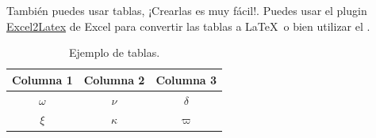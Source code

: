 	También puedes usar tablas, ¡Crearlas es muy fácil!. Puedes usar el plugin \href{https://www.ctan.org/tex-archive/support/excel2latex}{Excel2Latex} \cite{excel2latex} de Excel para convertir las tablas a \LaTeX\ o bien utilizar el  \cite{tablesgenerator}.

	\begin{table}[H]
		\centering
		\caption{Ejemplo de tablas.}
		\begin{tabular}{ccc}
			\hline
			\textbf{Columna 1} & \textbf{Columna 2} & \textbf{Columna 3} \bigstrut\\
			\hline
			$\omega$ & $\nu$ & $\delta$ \bigstrut[t]\\
			$\xi$ & $\kappa$ & $\varpi$ \bigstrut[b] \\
			\hline
		\end{tabular}
		\label{tab:tabla-1}
	\end{table}



